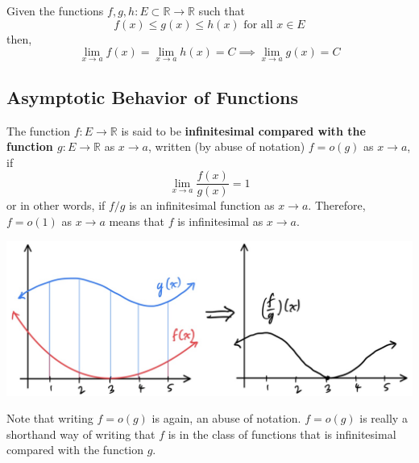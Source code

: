 \documentclass{article}
\begin{document}
    \begin{theorem}
    Given the functions $f, g, h: E \subset \mathbb{R} \longrightarrow \mathbb{R}$ such that
    \[f(x) \leq g(x) \leq h(x) \text{ for all } x \in E\]
    then, 
    \[\lim_{x \rightarrow a} f(x) = \lim_{x \rightarrow a} h(x) = C \implies \lim_{x \rightarrow a} g(x) = C\]
    \end{theorem}

  \subsection{Asymptotic Behavior of Functions}

    \begin{definition}
      The function $f: E \longrightarrow \mathbb{R}$ is said to be \textbf{infinitesimal compared with the function $g: E \longrightarrow \mathbb{R}$} as $x \rightarrow a$, written (by abuse of notation) $f = o(g)$ as $x \rightarrow a$, if 
      \[\lim_{x \rightarrow a} \frac{f(x)}{g(x)} = 1\]
      or in other words, if $f/g$ is an infinitesimal function as $x \rightarrow a$. Therefore, $f = o(1)$ as $x \rightarrow a$ means that $f$ is infinitesimal as $x \rightarrow a$. 
      \begin{center}
          \includegraphics[scale=0.25]{img/Little_o_Functions.jpg}
      \end{center}
      Note that writing $f = o(g)$ is again, an abuse of notation. $f = o(g)$ is really a shorthand way of writing that $f$ is in the class of functions that is infinitesimal compared with the function $g$. 
    \end{definition}
\end{document}
